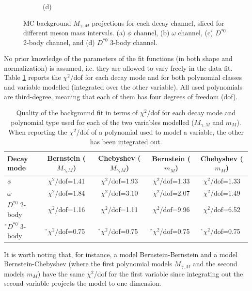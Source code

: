 \begin{figure}[!ht]
\begin{subfigure}[t]{0.50\mylength}
        \caption{\footnotesize (d)}
    \end{subfigure}%
\caption{MC background $M_{\gamma, M}$ projections for each decay channel, sliced for different meson mass intervals. (a) $\phi$ channel, (b) $\omega$ channel, (c) $D^{*0}$ 2-body channel, and (d) $D^{*0}$ 3-body channel.}
\label{fig:bkg_modelling_sliced}
    \vspace*{-0.0cm}
\end{figure}

No prior knowledge of the parameters of the fit functions (in both shape and normalization) is assumed, i.e. they are allowed to vary freely in the data fit. Table \ref{tab:bkg_polynomials} reports the $\chi^2$/dof for each decay mode and for both polynomial classes and variable modelled (integrated over the other variable). All used polynomials are third-degree, meaning that each of them has four degrees of freedom (dof).
\begin{table}[!ht]
    \centering
    \begin{tabular}{|l|c|c|c|c|}
        \hline
        \cellcolor{lightgray}Decay mode & \cellcolor{lightgray}Bernstein ($M_{\gamma, M}$) & \cellcolor{lightgray}Chebyshev ($M_{\gamma, M}$)   & \cellcolor{lightgray}Bernstein ($m_{M}$) & \cellcolor{lightgray}Chebyshev ($m_{M}$)\\ \hline
        $\phi$          &$\chi^2$/dof=1.41   &$\chi^2$/dof=1.93 &$\chi^2$/dof=1.33   &$\chi^2$/dof=1.33   \\
        $\omega$        &$\chi^2$/dof=1.84   &$\chi^2$/dof=3.10 &$\chi^2$/dof=2.07   &$\chi^2$/dof=1.49   \\
        $D^{*0}$ 2-body &$\chi^2$/dof=1.16   &$\chi^2$/dof=1.11 &$\chi^2$/dof=9.96   &$\chi^2$/dof=6.52   \\
        \r$D^{*0}$ 3-body &\r$\chi^2$/dof=0.75   &\r$\chi^2$/dof=0.75 &\r$\chi^2$/dof=0.75   &\r$\chi^2$/dof=0.75   \\
        \hline
        \end{tabular}
    \caption{Quality of the background fit in terms of $\chi^2$/dof for each decay mode and polynomial type used for each of the two variables modelled ($M_{\gamma, M}$ and $m_{M}$). When reporting the $\chi^2$/dof of a polynomial used to model a variable, the other has been integrated out.}
    \label{tab:bkg_polynomials}
\end{table}
It is worth noting that, for instance, a model Bernstein-Bernstein and a model Bernstein-Chebyshev (where the first polynomial models $M_{\gamma, M}$ and the second models $m_{M}$) have the same $\chi^2$/dof for the first variable since integrating out the second variable projects the model to one dimension.

